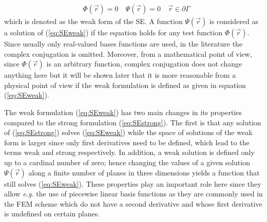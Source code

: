 {\begin{align}
    &\Phi(\vec{r})=0\quad
     \Psi(\vec{r})=0\quad  \vec{r}\in\partial\Gamma
\end{align}
which is denoted as the weak form of the SE.
A function $\Psi(\vec{r})$ is considered as a solution of (\ref{eq:SEweak}) if the equation holds for any test function $\Phi(\vec{r})$.
Since usually only real-valued bases functions are used, in the literature the complex conjugation is omitted.
Moreover, from a mathematical point of view, since $\Phi(\vec{r})$ is an arbitrary function, complex conjugation does not change anything here but it will be shown later that it is more reasonable from a physical point of view if the weak formulation is defined as given in equation (\ref{eq:SEweak}).

The weak formulation (\ref{eq:SEweak}) has two main changes in its properties compared to the strong formulation (\ref{eq:SEstrong}).
The first is that any solution of (\ref{eq:SEstrong}) solves (\ref{eq:SEweak}) while the space of solutions of the weak form is larger since only first derivatives need to be defined, which lead to the terms weak and strong respectively.
In addition, a weak solution is defined only up to a cardinal number of zero; hence changing the values of a given solution $\Psi(\vec{r})$ along a finite number of planes in three dimensions yields a function that still solves (\ref{eq:SEweak}).
These properties play an important role here since they allow \textit{e.g.} the use of piecewise linear basis functions as they are commonly used in the FEM scheme which do not have a second derivative and whose first derivative is undefined on certain planes.

}
